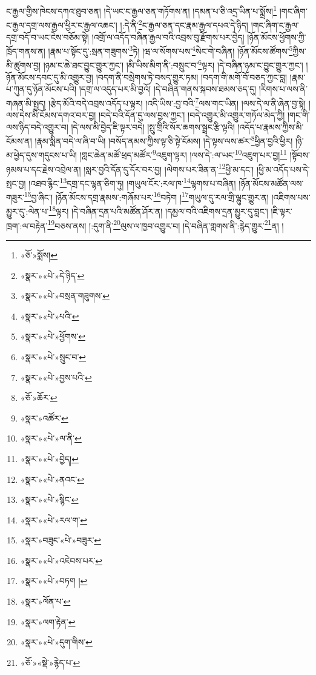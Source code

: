 ང་རྒྱལ་གྱིས་ཁེངས་དཀའ་ཐུབ་ཅན། །དེ་ཡང་ང་རྒྱལ་ཅན་གཏོགས་ན། །དམན་པ་ཅི་འདྲ་ཡིན་པ་སྨྲོས།\footnote{«ཅོ་»སྨོས།} །གང་ཞིག་ང་རྒྱལ་དགྲ་ལས་རྒྱལ་ཕྱིར་ང་རྒྱལ་འཆང་། །:དེ་ནི་\footnote{«སྣར་»«པེ་»དེ་ཉིད་}ང་རྒྱལ་ཅན་དང་རྣམ་རྒྱལ་དཔའ་དེ་ཉིད། །གང་ཞིག་ང་རྒྱལ་དགྲ་བདོ་བ་ཡང་ངེས་བཅོམ་སྟེ། །འགྲོ་ལ་འདོད་བཞིན་རྒྱལ་བའི་འབྲས་བུ་རྫོགས་པར་བྱེད། །ཉོན་མོངས་ཕྱོགས་ཀྱི་ཁྲོད་གནས་ན། །རྣམ་པ་སྟོང་དུ་:སྲན་གཟུགས་\footnote{«སྣར་»«པེ་»བསྲན་གཟུགས་}ཏེ། །ཝ་ལ་སོགས་པས་\footnote{«སྣར་»«པེ་»པའི་}སེང་གེ་བཞིན། །ཉོན་མོངས་ཚོགས་\footnote{«སྣར་»«པེ་»ཕྱོགས་}ཀྱིས་མི་ཚུགས་བྱ། །ཉམ་ང་ཆེ་ཐང་བྱུང་གྱུར་ཀྱང་། །མི་ཡིས་མིག་ནི་:བསྲུང་བ་\footnote{«སྣར་»«པེ་»སྲུང་བ་}ལྟར། །དེ་བཞིན་ཉམ་ང་བྱུང་གྱུར་ཀྱང་། །ཉོན་མོངས་དབང་དུ་མི་འགྱུར་བྱ། །བདག་ནི་བསྲེགས་ཏེ་བསད་གྱུར་ཏམ། །བདག་གི་མགོ་བོ་བཅད་ཀྱང་བླ། །རྣམ་པ་ཀུན་དུ་ཉོན་མོངས་པའི། །དགྲ་ལ་འདུད་པར་མི་བྱའོ། །དེ་བཞིན་གནས་སྐབས་ཐམས་ཅད་དུ། །རིགས་པ་ལས་ནི་གཞན་མི་སྤྱད། །རྩེད་མོའི་བདེ་འབྲས་འདོད་པ་ལྟར། །འདི་ཡིས་:བྱ་བའི་\footnote{«སྣར་»«པེ་»བྱས་པའི་}ལས་གང་ཡིན། །ལས་དེ་ལ་ནི་ཞེན་བྱ་སྟེ། །ལས་དེས་མི་ངོམས་དགའ་བར་བྱ། །བདེ་བའི་དོན་དུ་ལས་བྱས་ཀྱང་། །བདེ་འགྱུར་མི་འགྱུར་གཏོལ་མེད་ཀྱི། །གང་གི་ལས་ཉིད་བདེ་འགྱུར་བ། །དེ་ལས་མི་བྱེད་ཇི་ལྟར་བདེ། །སྤུ་གྲིའི་སོར་ཆགས་སྦྲང་རྩི་ལྟའི། །འདོད་པ་རྣམས་ཀྱིས་མི་ངོམས་ན། །རྣམ་སྨིན་བདེ་ལ་ཞི་བ་ཡི། །བསོད་ནམས་ཀྱིས་ལྟ་ཅི་སྟེ་ངོམས། །དེ་ལྟས་ལས་ཚར་\footnote{«ཅོ་»ཆོར་}ཕྱིན་བྱའི་ཕྱིར། །ཉི་མ་ཕྱེད་དུས་གདུངས་པ་ཡི། །གླང་ཆེན་མཚོ་ཕྲད་མཚོར་\footnote{«སྣར་»འཚོར་}འཇུག་ལྟར། །ལས་དེ་:ལ་ཡང་\footnote{«སྣར་»«པེ་»ལ་ནི་}འཇུག་པར་བྱ།\footnote{«སྣར་»«པེ་»བྱེད།} །སྟོབས་ཉམས་པ་དང་རྗེས་འབྲེལ་ན། །སླར་བྱའི་དོན་དུ་དོར་བར་བྱ། །ལེགས་པར་ཟིན་ན་\footnote{«སྣར་»«པེ་»ནའང་}ཕྱི་མ་དང་། །ཕྱི་མ་འདོད་པས་དེ་སྤང་བྱ། །འཐབ་རྙིང་\footnote{«སྣར་»«པེ་»སྙིང་}དགྲ་དང་ལྷན་ཅིག་ཏུ། །གཡུལ་ངོར་:རལ་ཁ་\footnote{«སྣར་»«པེ་»རལ་ག་}ལྷགས་པ་བཞིན། །ཉོན་མོངས་མཚོན་ལས་གཟུར་\footnote{«སྣར་»བཟུང་«པེ་»བཟུར་}བྱ་ཞིང་། །ཉོན་མོངས་དགྲ་རྣམས་:གཞོམ་པར་\footnote{«སྣར་»«པེ་»འཇེབས་པར་}བཏེག །\footnote{«སྣར་»«པེ་»བཏག །}གཡུལ་དུ་རལ་གྲི་ལྷུང་གྱུར་ན། །འཇིགས་པས་མྱུར་དུ་:ལེན་པ་\footnote{«སྣར་»ལོན་པ་}ལྟར། །དེ་བཞིན་དྲན་པའི་མཚོན་ཤོར་ན། །དམྱལ་བའི་འཇིགས་དྲན་མྱུར་དུ་བླང་། །ཇི་ལྟར་ཁྲག་:ལ་བརྟེན་\footnote{«སྣར་»ལག་རྟེན་}བཅས་ནས། །:དུག་ནི་\footnote{«སྣར་»«པེ་»དུག་གིས་}ལུས་ལ་ཁྱབ་འགྱུར་བ། །དེ་བཞིན་གླགས་ནི་:རྙེད་གྱུར་\footnote{«ཅོ་»«སྡེ་»རྙེད་པ་}ན། །
